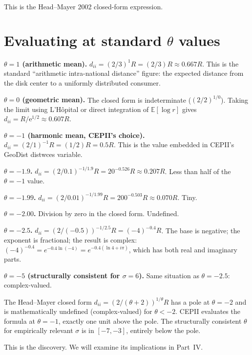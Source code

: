 \documentclass[11pt,letterpaper,oneside]{book}
\theoremstyle{definition}
\theoremstyle{remark}
\newcommand{\E}{\mathbb{E}}
\begin{document}
This is the Head--Mayer 2002 closed-form expression.

\section{Evaluating at standard $\theta$ values}

\textbf{$\theta = 1$ (arithmetic mean).} $d_{ii} = (2/3)^1 R = (2/3) R \approx 0.667 R$. This is the standard ``arithmetic intra-national distance'' figure: the expected distance from the disk center to a uniformly distributed consumer.

\textbf{$\theta = 0$ (geometric mean).} The closed form is indeterminate ($(2/2)^{1/0}$). Taking the limit using L'Hôpital or direct integration of $\E[\log r]$ gives $d_{ii} = R/\mathrm{e}^{1/2} \approx 0.607 R$.

\textbf{$\theta = -1$ (harmonic mean, CEPII's choice).} $d_{ii} = (2/1)^{-1} R = (1/2) R = 0.5 R$. This is the value embedded in CEPII's GeoDist distwces variable.

\textbf{$\theta = -1.9$.} $d_{ii} = (2/0.1)^{-1/1.9} R = 20^{-0.526} R \approx 0.207 R$. Less than half of the $\theta = -1$ value.

\textbf{$\theta = -1.99$.} $d_{ii} = (2/0.01)^{-1/1.99} R = 200^{-0.503} R \approx 0.070 R$. Tiny.

\textbf{$\theta = -2.00$.} Division by zero in the closed form. Undefined.

\textbf{$\theta = -2.5$.} $d_{ii} = (2/(-0.5))^{-1/2.5} R = (-4)^{-0.4} R$. The base is negative; the exponent is fractional; the result is complex: $(-4)^{-0.4} = e^{-0.4 \ln(-4)} = e^{-0.4(\ln 4 + i\pi)}$, which has both real and imaginary parts.

\textbf{$\theta = -5$ (structurally consistent for $\sigma = 6$).} Same situation as $\theta = -2.5$: complex-valued.

\begin{tcolorbox}[insight]
The Head--Mayer closed form $d_{ii} = (2/(\theta+2))^{1/\theta} R$ has a pole at $\theta = -2$ and is mathematically undefined (complex-valued) for $\theta < -2$. CEPII evaluates the formula at $\theta = -1$, exactly one unit above the pole. The structurally consistent $\theta$ for empirically relevant $\sigma$ is in $[-7, -3]$, entirely below the pole.
\end{tcolorbox}

This is the discovery. We will examine its implications in Part~IV.

\end{document}
